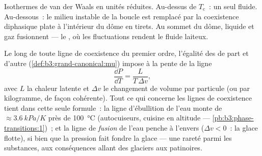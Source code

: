 \begin{omfigure}

{\small Isothermes de van der Waals en unités réduites. Au-dessus de
$T_{\text{c}}$~: un seul fluide. Au-dessous~: le milieu instable de
la boucle est remplacé par la coexistence diphasique plate à
l'intérieur du dôme en tirets. Au sommet du dôme, liquide et gaz
fusionnent --- le , où les fluctuations rendent le
fluide laiteux.}
\end{omfigure}

\begin{proposition}\label{prop:b3:phase-transitions:clapeyron}
Le long de toute ligne de coexistence du premier ordre, l'égalité
des  de part et d'autre
(\cref{def:b3:grand-canonical:mu}) impose à la pente de la ligne
\[
\frac{\dd P}{\dd T} = \frac{L}{T\,\Delta v} ,
\]
avec $L$ la chaleur latente et $\Delta v$ le changement de volume par
particule (ou par kilogramme, de façon cohérente). Tout ce qui
concerne les lignes de coexistence tient dans cette seule formule~:
la ligne d'ébullition de l'eau monte de
$\approx\qty{3.6}{kPa/K}$ près de \qty{100}{\celsius}
(autocuiseurs, cuisine en altitude ---
\cref{pb:b3:phase-transitions:1})~; et la ligne de \emph{fusion} de
l'eau penche à l'envers ($\Delta v < 0$~: la glace flotte), si bien
que la pression fait fondre la glace --- une rareté parmi les
substances, aux conséquences allant des glaciers aux patinoires.
\end{proposition}

